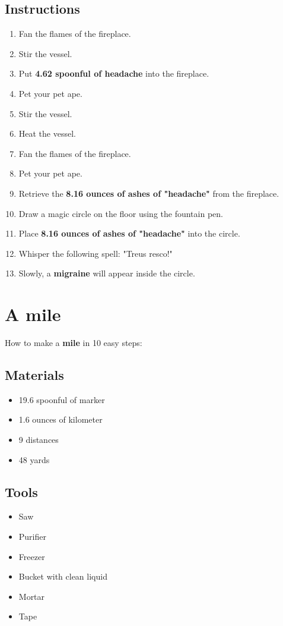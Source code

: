 \documentclass{article}
\begin{document}
\subsection{Instructions}\begin{enumerate}
\item 
Fan the flames of the fireplace.
\item 
Stir the vessel.
\item 
Put \textbf{4.62 spoonful of headache} into the fireplace.
\item 
Pet your pet ape.
\item 
Stir the vessel.
\item 
Heat the vessel.
\item 
Fan the flames of the fireplace.
\item 
Pet your pet ape.
\item 
Retrieve the \textbf{8.16 ounces of ashes of "headache"} from the fireplace.
\item 
Draw a magic circle on the floor using the fountain pen.
\item 
Place \textbf{8.16 ounces of ashes of "headache"} into the circle.
\item 
Whisper the following spell: "Treus resco!"
\item 
Slowly, a \textbf{migraine} will appear inside the circle.
\end{enumerate}
\newpage
\section{A mile}How to make a \textbf{mile} in 10 easy steps:

\subsection{Materials}\begin{itemize}
\item 
19.6 spoonful of marker
\item 
1.6 ounces of kilometer
\item 
9 distances
\item 
48 yards
\end{itemize}
\subsection{Tools}\begin{itemize}
\item 
Saw
\item 
Purifier
\item 
Freezer
\item 
Bucket with clean liquid
\item 
Mortar
\item 
Tape
\end{itemize}
\end{document}

